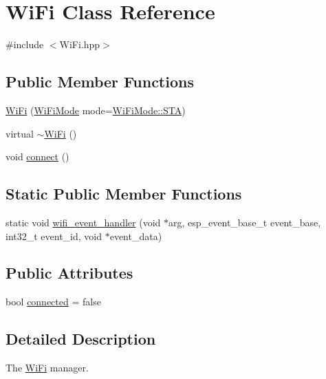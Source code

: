 \hypertarget{classWiFi}{}\section{Wi\+Fi Class Reference}
\label{classWiFi}


{\ttfamily \#include $<$Wi\+Fi.\+hpp$>$}

\subsection*{Public Member Functions}
\begin{DoxyCompactItemize}
\item 
\mbox{\hyperlink{classWiFi_ad2f9d73dfa338ebf49585e37f1c04cd6}{Wi\+Fi}} (\mbox{\hyperlink{WiFi_8hpp_ae685142b922ea26aa869f6cb5e17a19c}{Wi\+Fi\+Mode}} mode=\mbox{\hyperlink{WiFi_8hpp_ae685142b922ea26aa869f6cb5e17a19ca971ab16c6e59a04d070cb8d8da13418e}{Wi\+Fi\+Mode\+::\+S\+TA}})
\item 
virtual \mbox{\hyperlink{classWiFi_aa70d86d4709954beb1f79e73715dfd5b}{$\sim$\+Wi\+Fi}} ()
\item 
void \mbox{\hyperlink{classWiFi_a14ed13a3074adbfe7c2dc986b17ffa0a}{connect}} ()
\end{DoxyCompactItemize}
\subsection*{Static Public Member Functions}
\begin{DoxyCompactItemize}
\item 
static void \mbox{\hyperlink{classWiFi_a251a4d7fde9af75fb2fb305ad5c27a8e}{wifi\+\_\+event\+\_\+handler}} (void $\ast$arg, esp\+\_\+event\+\_\+base\+\_\+t event\+\_\+base, int32\+\_\+t event\+\_\+id, void $\ast$event\+\_\+data)
\end{DoxyCompactItemize}
\subsection*{Public Attributes}
\begin{DoxyCompactItemize}
\item 
bool \mbox{\hyperlink{classWiFi_a05428adefb3ddb169b962a06b9ee4fe5}{connected}} = false
\end{DoxyCompactItemize}


\subsection{Detailed Description}
The \mbox{\hyperlink{classWiFi}{Wi\+Fi}} manager. 

